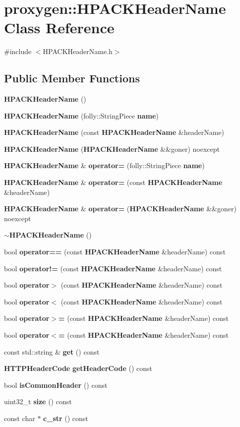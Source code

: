 \section{proxygen\+:\+:H\+P\+A\+C\+K\+Header\+Name Class Reference}
\label{classproxygen_1_1HPACKHeaderName}


{\ttfamily \#include $<$H\+P\+A\+C\+K\+Header\+Name.\+h$>$}

\subsection*{Public Member Functions}
\begin{DoxyCompactItemize}
\item 
{\bf H\+P\+A\+C\+K\+Header\+Name} ()
\item 
{\bf H\+P\+A\+C\+K\+Header\+Name} (folly\+::\+String\+Piece {\bf name})
\item 
{\bf H\+P\+A\+C\+K\+Header\+Name} (const {\bf H\+P\+A\+C\+K\+Header\+Name} \&header\+Name)
\item 
{\bf H\+P\+A\+C\+K\+Header\+Name} ({\bf H\+P\+A\+C\+K\+Header\+Name} \&\&goner) noexcept
\item 
{\bf H\+P\+A\+C\+K\+Header\+Name} \& {\bf operator=} (folly\+::\+String\+Piece {\bf name})
\item 
{\bf H\+P\+A\+C\+K\+Header\+Name} \& {\bf operator=} (const {\bf H\+P\+A\+C\+K\+Header\+Name} \&header\+Name)
\item 
{\bf H\+P\+A\+C\+K\+Header\+Name} \& {\bf operator=} ({\bf H\+P\+A\+C\+K\+Header\+Name} \&\&goner) noexcept
\item 
{\bf $\sim$\+H\+P\+A\+C\+K\+Header\+Name} ()
\item 
bool {\bf operator==} (const {\bf H\+P\+A\+C\+K\+Header\+Name} \&header\+Name) const 
\item 
bool {\bf operator!=} (const {\bf H\+P\+A\+C\+K\+Header\+Name} \&header\+Name) const 
\item 
bool {\bf operator$>$} (const {\bf H\+P\+A\+C\+K\+Header\+Name} \&header\+Name) const 
\item 
bool {\bf operator$<$} (const {\bf H\+P\+A\+C\+K\+Header\+Name} \&header\+Name) const 
\item 
bool {\bf operator$>$=} (const {\bf H\+P\+A\+C\+K\+Header\+Name} \&header\+Name) const 
\item 
bool {\bf operator$<$=} (const {\bf H\+P\+A\+C\+K\+Header\+Name} \&header\+Name) const 
\item 
const std\+::string \& {\bf get} () const 
\item 
{\bf H\+T\+T\+P\+Header\+Code} {\bf get\+Header\+Code} () const 
\item 
bool {\bf is\+Common\+Header} () const 
\item 
uint32\+\_\+t {\bf size} () const 
\item 
const char $\ast$ {\bf c\+\_\+str} () const 
\end{DoxyCompactItemize}
